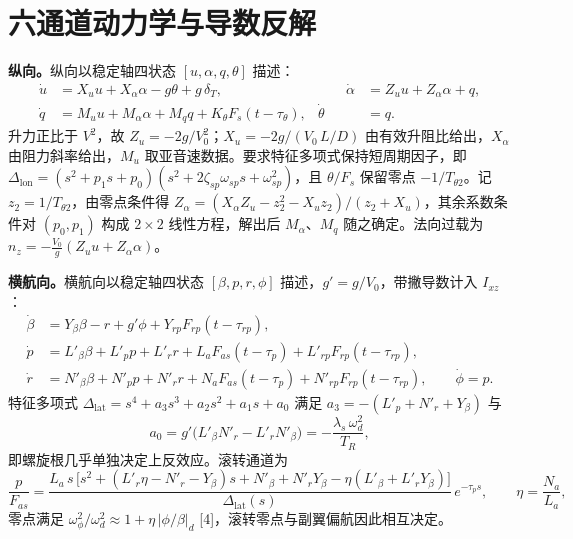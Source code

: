 \documentclass[UTF8,a4paper,11pt,fontset=fandol,scheme=plain]{ctexart}
\begin{document}
\section{六通道动力学与导数反解}
\label{app:model}
\textbf{纵向。}纵向以稳定轴四状态 \([u,\alpha,q,\theta]\) 描述：
\begin{equation}
\begin{aligned}
\dot u&=X_uu+X_\alpha\alpha-g\theta+g\,\delta_T, &\qquad \dot\alpha&=Z_uu+Z_\alpha\alpha+q,\\
\dot q&=M_uu+M_\alpha\alpha+M_qq+K_\theta F_s(t-\tau_\theta), & \dot\theta&=q .
\end{aligned}
\label{eq:lon}
\end{equation}
升力正比于 \(V^2\)，故 \(Z_u=-2g/V_0^2\)；\(X_u=-2g/(V_0\,L/D)\) 由有效升阻比给出，\(X_\alpha\) 由阻力斜率给出，\(M_u\) 取亚音速数据。要求特征多项式保持短周期因子，即 \(\Delta_{\mathrm{lon}}=(s^2+p_1s+p_0)(s^2+2\zeta_{sp}\omega_{sp}s+\omega_{sp}^2)\)，且 \(\theta/F_s\) 保留零点 \(-1/T_{\theta2}\)。记 \(z_2=1/T_{\theta2}\)，由零点条件得 \(Z_\alpha=(X_\alpha Z_u-z_2^2-X_uz_2)/(z_2+X_u)\)，其余系数条件对 \((p_0,p_1)\) 构成 \(2\times2\) 线性方程，解出后 \(M_\alpha\)、\(M_q\) 随之确定。法向过载为 \(n_z=-\tfrac{V_0}{g}(Z_uu+Z_\alpha\alpha)\)。

\textbf{横航向。}横航向以稳定轴四状态 \([\beta,p,r,\phi]\) 描述，\(g'=g/V_0\)，带撇导数计入 \(I_{xz}\)：
\begin{equation}
\begin{aligned}
\dot\beta&=Y_\beta\beta-r+g'\phi+Y_{rp}F_{rp}(t-\tau_{rp}),\\
\dot p&=L'_\beta\beta+L'_pp+L'_rr+L_aF_{as}(t-\tau_p)+L'_{rp}F_{rp}(t-\tau_{rp}),\\
\dot r&=N'_\beta\beta+N'_pp+N'_rr+N_aF_{as}(t-\tau_p)+N'_{rp}F_{rp}(t-\tau_{rp}),\qquad \dot\phi=p .
\end{aligned}
\label{eq:lat}
\end{equation}
特征多项式 \(\Delta_{\mathrm{lat}}=s^4+a_3s^3+a_2s^2+a_1s+a_0\) 满足 \(a_3=-(L'_p+N'_r+Y_\beta)\) 与
\begin{equation}
a_0=g'\bigl(L'_\beta N'_r-L'_rN'_\beta\bigr)=-\frac{\lambda_s\,\omega_d^2}{T_R},
\label{eq:a0}
\end{equation}
即螺旋根几乎单独决定上反效应。滚转通道为
\begin{equation}
\frac{p}{F_{as}}=\frac{L_a\,s\,\bigl[s^2+(L'_r\eta-N'_r-Y_\beta)s+N'_\beta+N'_rY_\beta-\eta(L'_\beta+L'_rY_\beta)\bigr]}{\Delta_{\mathrm{lat}}(s)}\,e^{-\tau_ps},\qquad \eta=\frac{N_a}{L_a},
\end{equation}
零点满足 \(\omega_\phi^2/\omega_d^2\approx1+\eta\,|\phi/\beta|_d\) [4]，滚转零点与副翼偏航因此相互决定。
\end{document}
